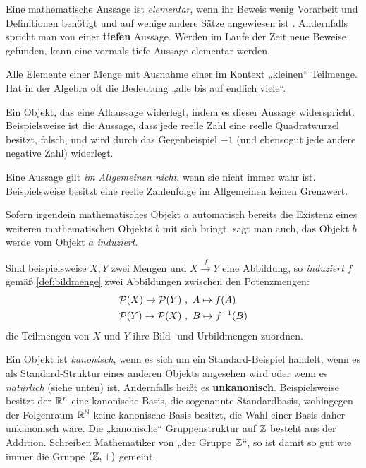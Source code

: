 \begin{description}[labelindent=0pt, leftmargin=0pt]
    \item[Elementar:] Eine mathematische Aussage ist \emph{elementar}, wenn ihr Beweis wenig Vorarbeit und Definitionen benötigt und auf wenige andere Sätze angewiesen ist . Andernfalls spricht man von einer \textbf{tiefen} Aussage. Werden im Laufe der Zeit neue Beweise gefunden, kann eine vormals tiefe Aussage elementar werden.

    \item[Fast alle:] Alle Elemente einer Menge mit Ausnahme einer im Kontext „kleinen“ Teilmenge. Hat in der Algebra oft die Bedeutung „alle bis auf endlich viele“.

    \item[Gegenbeispiel:] Ein Objekt, das eine Allaussage widerlegt, indem es dieser Aussage widerspricht. Beispielsweise ist die Aussage, dass jede reelle Zahl eine reelle Quadratwurzel besitzt, falsch, und wird durch das Gegenbeispiel $-1$ (und ebensogut jede andere negative Zahl) widerlegt.

    \item[Im Allgemeinen nicht:] Eine Aussage gilt \emph{im Allgemeinen nicht}, wenn sie nicht immer wahr ist. Beispielsweise besitzt eine reelle Zahlenfolge im Allgemeinen keinen Grenzwert.
    
    \item[Induzieren:]  Sofern irgendein mathematisches Objekt $a$ automatisch bereits die Existenz eines weiteren mathematischen Objekts $b$ mit sich bringt, sagt man auch, das Objekt $b$ werde vom Objekt $a$ \emph{induziert}.

    Sind beispielsweise $X,Y$ zwei Mengen und $X\xrightarrow{f} Y$ eine Abbildung, so \emph{induziert} $f$ gemäß \cref{def:bildmenge} zwei Abbildungen zwischen den Potenzmengen:
    \begin{align*}
        \mathcal P(X) \to \mathcal P(Y) \ & , \ A\mapsto f(A) \\
            \mathcal P(Y) \to \mathcal P(X) \ & , \ B\mapsto f^{-1}(B)
    \end{align*}
    die Teilmengen von $X$ und $Y$ ihre Bild- und Urbildmengen zuordnen.
    
    \item[Kanonisch:]  Ein Objekt ist \emph{kanonisch}, wenn es sich um ein Standard-Beispiel handelt, wenn es als Standard-Struktur eines anderen Objekts angesehen wird oder wenn es \emph{natürlich} (siehe unten) ist. Andernfalls heißt es \textbf{unkanonisch}. Beispielsweise besitzt der $\mathbb R^n$ eine kanonische Basis, die sogenannte Standardbasis, wohingegen der Folgenraum $\mathbb R^\mathbb N$ keine kanonische Basis besitzt, die Wahl einer Basis daher unkanonisch wäre. Die „kanonische“ Gruppenstruktur auf $\mathbb Z$ besteht aus der Addition. Schreiben Mathematiker von „der Gruppe $\mathbb Z$“, so ist damit so gut wie immer die Gruppe $(\mathbb Z,+)$ gemeint.


\end{description}
